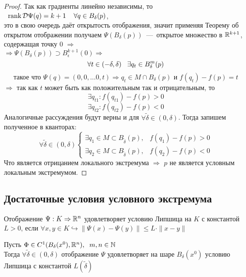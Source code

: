 \begin{proof}
    Так как градиенты линейно независимы, то  $ \hspace{0.2cm} \operatorname{rank} \mathcal{D} \Psi(q) = k + 1 \hspace{0.4cm}\forall q \in B_{\delta}(p)$, \\
    это в свою очередь даёт открытость отображения, значит применяя Теорему об открытом отображении получаем
    $\Psi(B_{\delta}(p))$~---~открытое множество в $\mathbb{R}^{k + 1}$, содержащая точку 0 $\Rightarrow$ \\
    $\Rightarrow \Psi(B_{\delta}(p)) \supset B_{\epsilon}^{k+1}(0) \Rightarrow$ 
    \[\forall t \in (-\delta, \delta) \hspace{0.3cm} \exists q_t \in B_\delta^m(p)\]
    \[\text{такое что } \Psi(q) = (0, 0, \dots 0, t) \Rightarrow q_t \in M \cap B_{\delta}(p) \text{ и } f(q_t) - f(p) = t\]
    $\Rightarrow$ так как $t$ может быть как положительным так и отрицательным, то 
    \[\exists q_{t1}:  f(q_{t1}) - f(p) > 0\]
    \[\exists q_{t2}:  f(q_{t2}) - f(p) < 0\] 
    Аналогичные рассуждения будут верны и для $\forall \widetilde{\delta} \in (0, \delta)$. Тогда запишем полученное в кванторах:
    \begin{equation*}
        \forall \widetilde{\delta} \in (0, \delta)
        \begin{cases}
            \exists q_1 \in M \subset B_{\widetilde{\delta}}(p), & f(q_1) - f(p) > 0 \\
            \exists q_2 \in M \subset B_{\widetilde{\delta}}(p), & f(q_2) - f(p) < 0
        \end{cases}
    \end{equation*}
    Что является отрицанием локального экстремума $\Rightarrow$ $p$ не является условным локальным экстремумом.
\end{proof}

\subsection{Достаточные условия условного экстремума}

\begin{definition}
    Отображение $\Psi: K \Rightarrow \mathbb{R}^n$ удовлетворяет условию Липшица на $K$ с константой $L > 0$, если $\forall x, y \in K \hookrightarrow \| \Psi(x) - \Psi(y) \| \leq L \cdot \|x - y\|$
\end{definition}

\begin{lemma}
    Пусть $\Phi \in C^1(B_{\delta}(x^0), \mathbb{R}^n), \hspace{0.2cm} m, n \in \mathbb{N}$ \\
    Тогда $\forall \tilde{\delta} \in (0, \delta)$ отображение $\Psi$ удовлетворяет на шаре $B_{\delta}(x^0)$ условию Липшица с константой $L(\tilde{\delta})$
\end{lemma}

